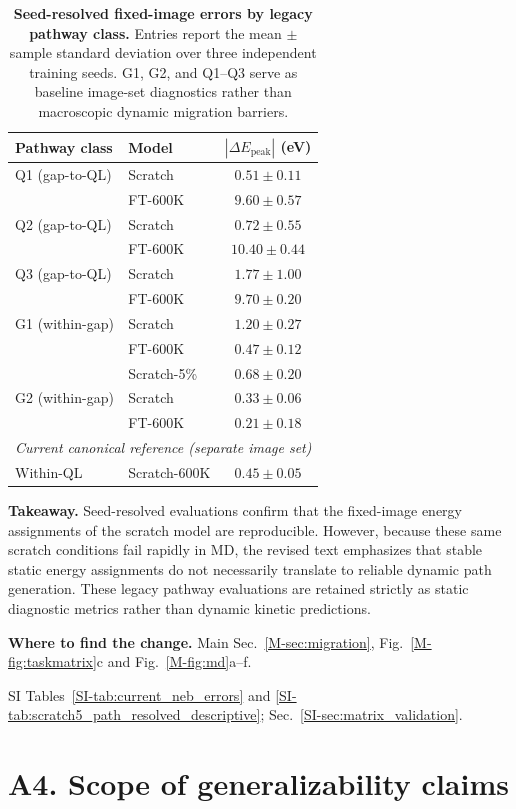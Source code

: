 \documentclass[11pt]{article}
\newcommand{\location}[2]{\par{\small\textbf{Where to find the change.} #1\par #2}\par}
\begin{document}
\begin{table}[!htbp]
\centering\small
\caption{\textbf{Seed-resolved fixed-image errors by legacy pathway class.} Entries report the mean $\pm$ sample standard deviation over three independent training seeds. G1, G2, and Q1--Q3 serve as baseline image-set diagnostics rather than macroscopic dynamic migration barriers.}
\label{tab:resp-a3-path-errors}
\begin{tabular}{llc}
\toprule
Pathway class & Model & $|\Delta E_{\mathrm{peak}}|$ (eV) \\
\midrule
Q1 (gap-to-QL) & Scratch & $0.51\pm0.11$ \\
 & FT-600K & $9.60\pm0.57$ \\
Q2 (gap-to-QL) & Scratch & $0.72\pm0.55$ \\
 & FT-600K & $10.40\pm0.44$ \\
Q3 (gap-to-QL) & Scratch & $1.77\pm1.00$ \\
 & FT-600K & $9.70\pm0.20$ \\
G1 (within-gap) & Scratch & $1.20\pm0.27$ \\
 & FT-600K & $0.47\pm0.12$ \\
 & Scratch-5\% & $0.68\pm0.20$ \\
G2 (within-gap) & Scratch & $0.33\pm0.06$ \\
 & FT-600K & $0.21\pm0.18$ \\
\midrule
\multicolumn{3}{l}{\textit{Current canonical reference (separate image set)}}\\
\midrule
Within-QL & Scratch-600K & $0.45\pm0.05$ \\
\bottomrule
\end{tabular}
\end{table}

\textbf{Takeaway.} Seed-resolved evaluations confirm that the fixed-image energy assignments of the scratch model are reproducible. However, because these same scratch conditions fail rapidly in MD, the revised text emphasizes that stable static energy assignments do not necessarily translate to reliable dynamic path generation. These legacy pathway evaluations are retained strictly as static diagnostic metrics rather than dynamic kinetic predictions.
\location{Main Sec.~\ref{M-sec:migration}, Fig.~\ref{M-fig:taskmatrix}c and Fig.~\ref{M-fig:md}a--f.}{SI Tables~\ref{SI-tab:current_neb_errors} and \ref{SI-tab:scratch5_path_resolved_descriptive}; Sec.~\ref{SI-sec:matrix_validation}.}

\section*{A4. Scope of generalizability claims}
\end{document}

